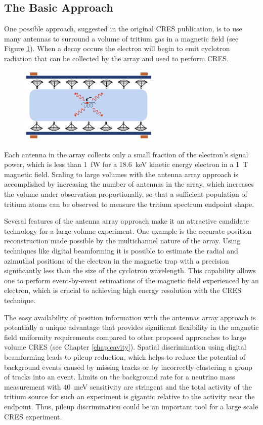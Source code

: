 \subsection{The Basic Approach}

One possible approach, suggested in the original CRES publication, is to use many antennas to surround a volume of tritium gas in a magnetic field (see Figure \ref{fig:chap3-antenna-concept-cartoon}). When a decay occurs the electron will begin to emit cyclotron radiation that can be collected by the array and used to perform CRES.
\begin{figure}[htbp]
    \centering
    \includegraphics*[width=0.6\textwidth]{figs/Chapter-3/230614_antenna_cartoon.png}
    \caption{\label{fig:chap3-antenna-concept-cartoon}}
\end{figure}
Each antenna in the array collects only a small fraction of the electron's signal power, which is less than 1~fW for a 18.6~keV kinetic energy electron in a 1~T magnetic field. Scaling to large volumes with the antenna array approach is accomplished by increasing the number of antennas in the array, which increases the volume under observation proportionally, so that a sufficient population of tritium atoms can be observed to measure the tritium spectrum endpoint shape. 

Several features of the antenna array approach make it an attractive candidate technology for a large volume experiment. One example is the accurate position reconstruction made possible by the multichannel nature of the array. Using techniques like digital beamforming it is possible to estimate the radial and azimuthal positions of the electron in the magnetic trap with a precision significantly less than the size of the cyclotron wavelength. This capability allows one to perform event-by-event estimations of the magnetic field experienced by an electron, which is crucial to achieving high energy resolution with the CRES technique.

The easy availability of position information with the antennas array approach is potentially a unique advantage that provides significant flexibility in the magnetic field uniformity requirements compared to other proposed approaches to large volume CRES (see Chapter \ref{chap:cavity}). Spatial discrimination using digital beamforming leads to pileup reduction, which helps to reduce the potential of background events caused by missing tracks or by incorrectly clustering a group of tracks into an event. Limits on the background rate for a neutrino mass measurement with 40~meV sensitivity are stringent and the total activity of the tritium source for such an experiment is gigantic relative to the activity near the endpoint. Thus, pileup discrimination could be an important tool for a large scale CRES experiment.

